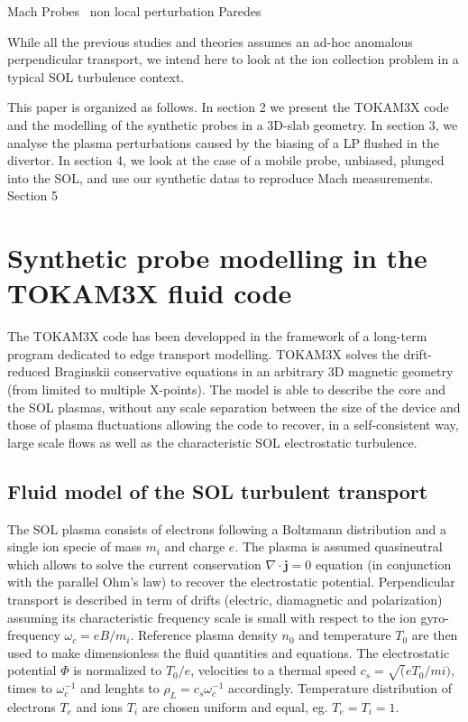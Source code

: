 \documentclass[cpp,a4paper,fleqn,twoside%
]{w-art}
\begin{document}
Mach Probes~\cite{Stangeby84, Hutchinson87,Hutchinson88,Matthews89, 
Hutchinson91,Chung12} non local perturbation Paredes~\cite{Paredes14}

While all the previous studies and theories assumes an ad-hoc anomalous 
perpendicular transport, we intend here to 
look at the ion collection problem in a typical SOL turbulence context.


This paper is organized as follows. In section 2 we present the
TOKAM3X code~\cite{Tamain16} and the modelling of the
synthetic probes in a 3D-slab geometry. In section 3, we analyse the
plasma perturbations caused by the biasing of a LP flushed in the divertor. In
section 4, we look at the case of a mobile probe, unbiased,
plunged into the SOL, and use our synthetic datas to reproduce Mach
measurements. Section 5 

\section{Synthetic probe modelling in the TOKAM3X fluid code}
\label{2D}

The TOKAM3X code has been developped in the framework of a long-term program
dedicated to edge transport modelling. TOKAM3X solves the drift-reduced
Braginskii conservative equations in an arbitrary 3D magnetic geometry (from
limited to multiple X-points). The model is able to describe the core
and the SOL plasmas, without any scale separation between the size of the
device and those of plasma fluctuations allowing the code to recover, in a self-consistent way, large
scale flows as well as the characteristic SOL electrostatic turbulence.

\subsection{\bf Fluid model of the SOL turbulent transport}

The SOL plasma consists of electrons following a Boltzmann distribution and a
single ion specie of mass $m_i$ and charge $e$. The plasma is assumed quasineutral
which allows to solve the current conservation $\nabla\cdot\mathbf j=0$
equation (in conjunction with the parallel Ohm's law) to recover the
electrostatic potential.
Perpendicular transport is described in term of drifts (electric, diamagnetic
and polarization) assuming its characteristic frequency scale is
small with respect to the ion gyro-frequency $\omega_c=eB/m_i$.
Reference plasma density $n_0$ and temperature $T_0$ are then used to make dimensionless the fluid quantities and
equations. The electrostatic potential $\Phi$ is normalized to
$T_0/e$, velocities to a thermal speed $c_s=\sqrt(eT_0/mi)$, times to
$\omega_c^{-1}$ and lenghts to $\rho_L=c_s\omega_c^{-1}$ accordingly.
Temperature distribution of electrons $T_e$ and ions $T_i$ are chosen uniform
and equal, eg. $T_e=T_i=1$.
\end{document}
